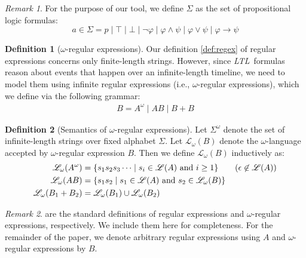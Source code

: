 \documentclass[conference]{IEEEtran}
\theoremstyle{definition}
\newtheorem{definition}{Definition}[section]
\theoremstyle{remark}
\newtheorem{remark}{Remark}[section]
\newcommand{\limplies}{\rightarrow}
\newcommand{\ltl}{\textit{LTL}}
\renewcommand{\phi}{\varphi}
\renewcommand{\L}{\mathscr{L}}
\begin{document}
\begin{remark}
    For the purpose of our tool, we define $\Sigma$ as the set of propositional logic formulas:
    \[
    a \in \Sigma = p \mid \top \mid \bot \mid \neg \phi \mid \phi \land \psi \mid \phi \lor \psi \mid \phi \limplies \psi
    \]
\end{remark}

\begin{definition}[$\omega$-regular expressions]\label{def:omega-regex}
    Our definition \ref{def:regex} of regular expressions concerns only finite-length strings. However, since \ltl\ formulas reason about events that happen over an infinite-length timeline, we need to model them using infinite regular expressions (i.e., $\omega$-regular expressions), which we define via the following grammar:
    \begin{align*}
        B = A^{\omega} \mid AB \mid B + B
    \end{align*}
\end{definition}
\begin{definition}[Semantics of $\omega$-regular expressions]\label{def:omega-semantics}
    Let $\Sigma^{\omega}$ denote the set of infinite-length strings over fixed alphabet $\Sigma$. Let $\L_{\omega}(B)$ denote the $\omega$-language accepted by $\omega$-regular expression $B$. Then we define $\L_{\omega}(B)$ inductively as:
    \begin{align*}
        \L_{\omega}(A^{\omega}) & = \{s_1s_2s_3\cdots \mid s_i \in \L(A) \text{ and } i \ge 1\} \tag{$\epsilon
         \not\in \L(A)$} \\
        \L_{\omega}(AB) & = \{s_1s_2 \mid s_1 \in \L(A) \text{ and } s_2 \in \L_{\omega}(B)\} \\
        \L_{\omega}(B_1 + B_2) &= \L_{\omega}(B_1) \cup \L_{\omega}(B_2)
    \end{align*}
\end{definition}

\begin{remark}
   are the standard definitions of regular expressions and $\omega$-regular expressions, respectively.  We include them here for completeness. For the remainder of the paper, we denote arbitrary regular expressions using $A$ and $\omega$-regular expressions by $B$.
\end{remark}
\end{document}
